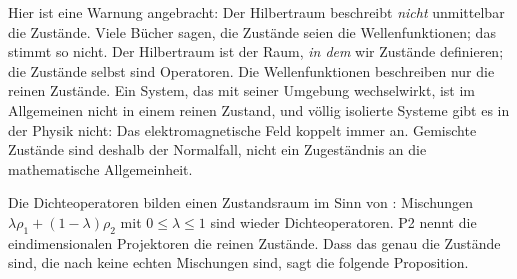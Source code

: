 Hier ist eine Warnung angebracht: Der Hilbertraum beschreibt \emph{nicht} unmittelbar die
Zustände. Viele Bücher sagen, die Zustände seien die Wellenfunktionen; das stimmt so nicht. Der
Hilbertraum ist der Raum, \emph{in dem} wir Zustände definieren; die Zustände selbst sind
Operatoren. Die Wellenfunktionen beschreiben nur die reinen Zustände. Ein System, das mit seiner
Umgebung wechselwirkt, ist im Allgemeinen nicht in einem reinen Zustand, und völlig isolierte
Systeme gibt es in der Physik nicht: Das elektromagnetische Feld koppelt immer an. Gemischte
Zustände sind deshalb der Normalfall, nicht ein Zugeständnis an die mathematische Allgemeinheit.

Die Dichteoperatoren bilden einen Zustandsraum im Sinn von : Mischungen
$\lambda\rho_1 + (1-\lambda)\rho_2$ mit $0 \leq \lambda \leq 1$ sind wieder Dichteoperatoren. P2
nennt die eindimensionalen Projektoren die reinen Zustände. Dass das genau die Zustände sind, die
nach  keine echten Mischungen sind, sagt die folgende Proposition.

